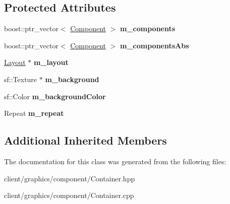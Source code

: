 \subsection*{Protected Attributes}
\begin{DoxyCompactItemize}
\item 
\hypertarget{classgraphics_1_1_container_a915b043459dd9bb1b7fa5690f1090282}{boost\-::ptr\-\_\-vector$<$ \hyperlink{classgraphics_1_1_component}{Component} $>$ {\bfseries m\-\_\-components}}\label{classgraphics_1_1_container_a915b043459dd9bb1b7fa5690f1090282}

\item 
\hypertarget{classgraphics_1_1_container_a43d4c1da3317edf8f57459939c76951c}{boost\-::ptr\-\_\-vector$<$ \hyperlink{classgraphics_1_1_component}{Component} $>$ {\bfseries m\-\_\-components\-Abs}}\label{classgraphics_1_1_container_a43d4c1da3317edf8f57459939c76951c}

\item 
\hypertarget{classgraphics_1_1_container_a73f3976e31f24f554e6901954f3a752e}{\hyperlink{classgraphics_1_1_layout}{Layout} $\ast$ {\bfseries m\-\_\-layout}}\label{classgraphics_1_1_container_a73f3976e31f24f554e6901954f3a752e}

\item 
\hypertarget{classgraphics_1_1_container_a16b4a21fb3b91cbb051b2dafaa3daebd}{sf\-::\-Texture $\ast$ {\bfseries m\-\_\-background}}\label{classgraphics_1_1_container_a16b4a21fb3b91cbb051b2dafaa3daebd}

\item 
\hypertarget{classgraphics_1_1_container_aed0a59268f612de7c8ffdc0a3326de63}{sf\-::\-Color {\bfseries m\-\_\-background\-Color}}\label{classgraphics_1_1_container_aed0a59268f612de7c8ffdc0a3326de63}

\item 
\hypertarget{classgraphics_1_1_container_a160ddbdabd9c2cdc5d1b92941c418047}{Repeat {\bfseries m\-\_\-repeat}}\label{classgraphics_1_1_container_a160ddbdabd9c2cdc5d1b92941c418047}

\end{DoxyCompactItemize}
\subsection*{Additional Inherited Members}


The documentation for this class was generated from the following files\-:\begin{DoxyCompactItemize}
\item 
client/graphics/component/Container.\-hpp\item 
client/graphics/component/Container.\-cpp\end{DoxyCompactItemize}

